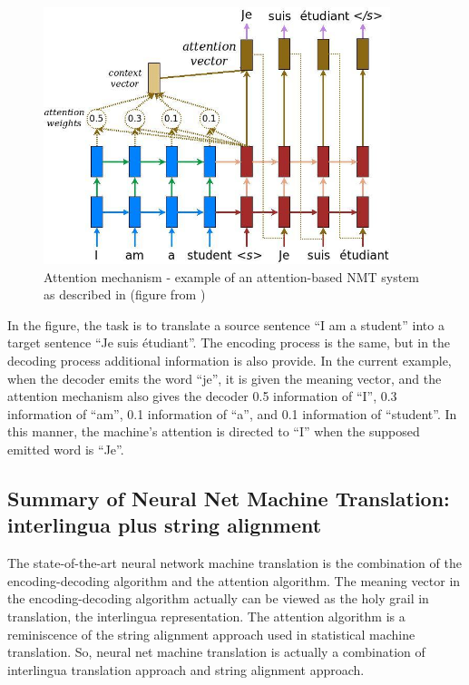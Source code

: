 \documentclass[final]{ua-thesis}
\numberwithin{equation}{section}
\begin{document}
\begin{figure}[h]
\caption{Attention mechanism - example of an attention-based NMT system as described in \citet{luong2015effective} (figure from \citet{luong17GitHub})}
\centering
\includegraphics[width=0.9\textwidth]{attention_mechanism.jpg}
\end{figure} 

In the figure, the task is to translate a source sentence ``I am a student'' into a target sentence ``Je suis \'{e}tudiant''.
The encoding process is the same, but in the decoding process additional information is also provide. In the current example, when the decoder emits the word ``je'', it is given the meaning vector, and the attention mechanism also gives the decoder 0.5  information of ``I'', 0.3 information of ``am'', 0.1 information of ``a'', and 0.1 information of ``student''. In this manner, the machine's attention is directed to ``I'' when the supposed emitted word is ``Je''. 

\subsection{Summary of Neural Net Machine Translation: interlingua plus string alignment}

The state-of-the-art neural network machine translation is the combination of the encoding-decoding algorithm and the attention algorithm. The meaning vector in the encoding-decoding algorithm actually can be viewed as the holy grail in translation, the interlingua representation. The attention algorithm is a reminiscence of the string alignment approach used in statistical machine translation. So, neural net machine translation is actually a combination of interlingua  translation approach and string alignment approach.   
\end{document}
